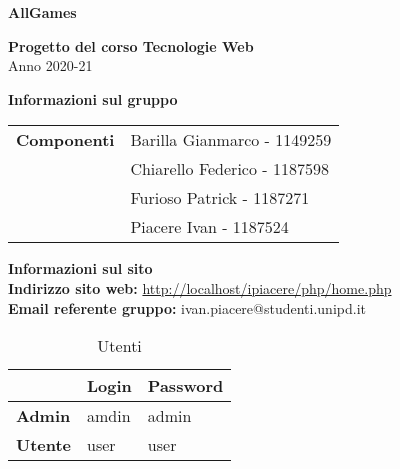 \begin{center}
	\textbf{\Huge{AllGames}}\\
	\vspace{15pt}
\end{center}

\vspace{1.5cm}

\begin{center}
	\textbf{\huge{Progetto del corso Tecnologie Web}}\\[0.2cm]
	\Large{Anno 2020-21}
\end{center}

\vspace{5pt}

\begin{center}
	\textbf{\Large{Informazioni sul gruppo}}
\begin{table}[H]
	\hspace{3.5cm}
	\renewcommand{\arraystretch}{1.4}
	\begin{tabular}{l | l}
		\textbf{Componenti} & Barilla Gianmarco - 1149259\\
		& Chiarello Federico - 1187598\\
		& Furioso Patrick - 1187271\\
		& Piacere Ivan - 1187524\\
	\end{tabular}
\end{table}
\end{center}

\hspace{5pt}

\begin{center}
	\textbf{\Large{Informazioni sul sito}}\\
	\textbf{Indirizzo sito web:} \url{http://localhost/ipiacere/php/home.php}\\
	\textbf{Email referente gruppo:} ivan.piacere@studenti.unipd.it

	\renewcommand{\arraystretch}{1.8}
	\begin{longtable}[H]{| p{.18\hsize} | p{.18\hsize} | p{.18\hsize} |}
		\caption{Utenti}\\
		\rowcolor[HTML]{C14638}
	\multicolumn{1}{c}{\color[HTML]{FFFFFF} \textbf{Utente}} &
		\multicolumn{1}{c}{\color[HTML]{FFFFFF} \textbf{Login}} &
		\multicolumn{1}{c}{\color[HTML]{FFFFFF} \textbf{Password}} \\
		\endhead
		
		\textbf{Admin} & amdin & admin\\
		\hline
		\textbf{Utente} & user & user\\
		\hline
	\end{longtable}
\end{center}



